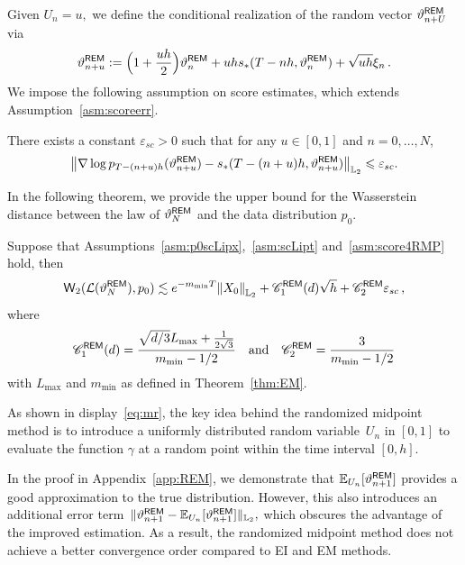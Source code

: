 \documentclass[11pt]{article}
\def\Ltwo{\mathbb L_2}
\def\wass{{\sf W}}
\def\l|{\left\lVert}
\def\r|{\right\rVert}
\def\E{\mathbb E}
\begin{document}
Given $U_n=u,$ we define the conditional realization of the random vector $\vartheta^{\sf REM}_{n+U}$ via
\begin{align*}
\vartheta^{\sf REM}_{n+u}:= \Big(1+\frac{uh}{2}\Big)\vartheta_n^{\sf REM}+uhs_*(T-nh,\vartheta_n^{\sf REM})+\sqrt{uh}\xi_n\,.
\end{align*}
We impose the following assumption on score estimates, which extends Assumption~\ref{asm:scoreerr}.
\begin{assumption}
    \label{asm:score4RMP}
    There exists a constant $\varepsilon_{sc}>0$ such that for any $u\in[0,1]$ and $n=0,\dots,N$,
    \begin{align*}
        \l|\nabla\log p_{T-(n+u)h}(\vartheta_{n+u}^{\sf REM})-s_*(T-(n+u)h,\vartheta_{n+u}^{\sf REM})\r|_{\Ltwo} 
        \leqslant \varepsilon_{sc}.
    \end{align*}
\end{assumption}
\vspace{-0.2cm}
In the following theorem, we provide the upper bound for the Wasserstein distance between the law of $\vartheta_N^{\sf REM}$ and the data distribution $p_0$.
\begin{theorem}
    \label{thm:RMPEM}
    Suppose that Assumptions~\ref{asm:p0scLipx},~\ref{asm:scLipt} and~\ref{asm:score4RMP} hold, then 
    \begin{align*}
        \wass_2(\mathcal{L}(\vartheta_N^{\sf REM}),p_0)\lesssim e^{-m_{\min}T}\l|X_0\r|_{\Ltwo}+\mathscr C_1^{\sf REM}(d)\sqrt{h}+\mathscr C_2^{\sf REM}\varepsilon_{sc}\,,
    \end{align*}
    where 
    \begin{align*}
       \mathscr C_1^{\sf REM}(d)=\dfrac{\sqrt{d/3}L_{\max}+\frac{1}{2\sqrt{3}}}{m_{\min}-1/2}~~\text{ and }~~ 
       \mathscr C_2^{\sf REM}=\dfrac{3}{m_{\min}-1/2}
    \end{align*}
    with $L_{\max}$ and $m_{\min}$ as defined in Theorem~\ref{thm:EM}.
\end{theorem}
As shown in display~\eqref{eq:mr}, the key idea behind the randomized midpoint method is to introduce a uniformly distributed random variable~$U_n$ in $[0,1]$ to evaluate the function $\gamma$ at a random point within the time interval $[0,h]$.

In the proof in Appendix~\ref{app:REM}, we demonstrate that $\E_{U_n}[\vartheta_{n+1}^{\sf REM}]$ provides a good approximation to the true distribution. 
However, this also introduces an additional error term~$\|\vartheta^{\sf REM}_{n+1}-\E_{U_n}[\vartheta^{\sf REM}_{n+1}]\|_{\Ltwo},$ which obscures the advantage of the improved estimation. As a result, the randomized midpoint method does not achieve a better convergence order compared to {\sf EI} and {\sf EM} methods.
\end{document}
